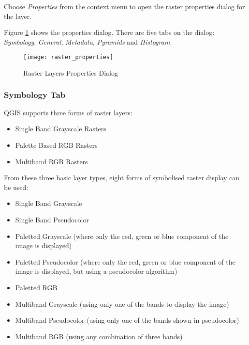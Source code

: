 Choose \textsl{Properties} from the context menu to open the raster properties
dialog for the layer.

Figure \ref{fig:raster_properties} shows the properties dialog. There are five
tabs on the dialog: \textsl{Symbology}, \textsl{General}, \textsl{Metadata}, \textsl{Pyramids} and \textsl{Histogram}.

\begin{figure}[h]
   \begin{center}
   \caption{Raster Layers Properties
Dialog}\label{fig:raster_properties}\smallskip
   \texttt{[image: raster\_properties]}
\end{center}  
\end{figure}

\subsubsection{Symbology Tab}\label{label_sombology}

QGIS supports three forms of raster layers:

\begin{itemize}
\item Single Band Grayscale Rasters
\item Palette Based RGB Rasters
\item Multiband RGB Rasters
\end{itemize}

From these three basic layer types, eight forms of symbolised raster display
can be used:

\begin{itemize}
\item Single Band Grayscale
\item Single Band Pseudocolor
\item Paletted Grayscale (where only the red, green or blue component of the
image is displayed)
\item Paletted Pseudocolor (where only the red, green or blue component of the
image is displayed, but using a pseudocolor algorithm)
\item Paletted RGB
\item Multiband Grayscale (using only one of the bands to display the image)
\item Multiband Pseudocolor (using only one of the bands shown in
pseudocolor)
\item Multiband RGB (using any combination of three bands)
\end{itemize}

